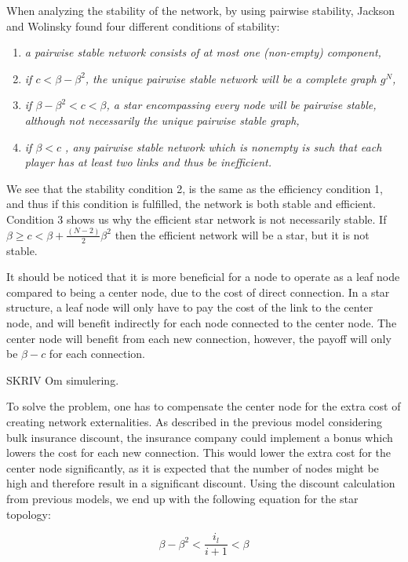 When analyzing the stability of the network, by using pairwise stability, Jackson and Wolinsky found four different conditions of stability:

\begin{enumerate}
\item \textit{a pairwise stable network consists of at most one (non-empty) component,}
\item \textit{if $c<\beta - \beta^2$, the unique pairwise stable network will be a complete graph $g^N$, }
\item \textit{if $\beta - \beta^2 <c < \beta $, a star encompassing every node will be pairwise stable, although not necessarily the unique pairwise stable graph,}
\item \textit{if $\beta < c$ , any pairwise stable network which is nonempty is such that each player has at least two links and thus be inefficient. }
\end{enumerate}
We see that the stability condition 2, is the same as the efficiency condition 1, and thus if this condition is fulfilled, the network is both stable and efficient. 
Condition 3 shows us why the efficient star network is not necessarily  stable. If $\beta \geq c <   \beta + \frac{(N-2)}{2}\beta^2$ then the efficient network will be a star, but it is not stable.

It should be noticed that it is more beneficial for a node to operate as a leaf node compared to being a center node, due to the cost of direct connection. In a star structure, a leaf node will only have to pay the cost of the link to the center node, and will benefit indirectly for each node connected to the center node. The center node will benefit from each new connection, however, the payoff will only be $\beta - c$ for each connection. 

SKRIV Om simulering.

To solve the problem, one has to compensate the center node for the extra cost of creating network externalities. As described in the previous model considering bulk insurance discount, the insurance company could implement a bonus which lowers the cost for each new connection. This would lower the extra cost for the center node significantly, as it is expected that the number of nodes might be high and therefore result in a significant discount. 
Using the discount calculation from previous models, we end up with the following equation for the star topology:

\begin{equation}
\beta-\beta^2<\frac{i_{l}}{i+1}< \beta
\end{equation}



